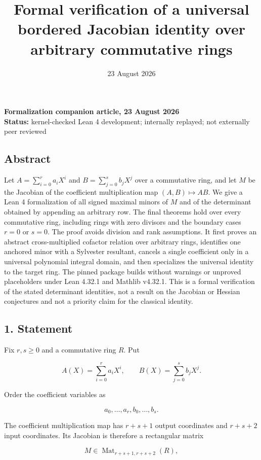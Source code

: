\documentclass[
  11pt,
  a4paper,
]{article}
\title{Formal verification of a universal bordered Jacobian identity
over arbitrary commutative rings}
\author{}
\date{23 August 2026}
\begin{document}
\maketitle

\textbf{Formalization companion article, 23 August 2026}\\
\textbf{Status:} kernel-checked Lean 4 development; internally replayed;
not externally peer reviewed

\subsection{Abstract}\label{abstract}

Let \(A=\sum_{i=0}^r a_iX^i\) and \(B=\sum_{j=0}^s b_jX^j\) over a
commutative ring, and let \(M\) be the Jacobian of the coefficient
multiplication map \((A,B)\mapsto AB\). We give a Lean 4 formalization
of all signed maximal minors of \(M\) and of the determinant obtained by
appending an arbitrary row. The final theorems hold over every
commutative ring, including rings with zero divisors and the boundary
cases \(r=0\) or \(s=0\). The proof avoids division and rank
assumptions. It first proves an abstract cross-multiplied cofactor
relation over arbitrary rings, identifies one anchored minor with a
Sylvester resultant, cancels a single coefficient only in a universal
polynomial integral domain, and then specializes the universal identity
to the target ring. The pinned package builds without warnings or
unproved placeholders under Lean 4.32.1 and Mathlib v4.32.1. This is a
formal verification of the stated determinant identities, not a result
on the Jacobian or Hessian conjectures and not a priority claim for the
classical identity.

\subsection{1. Statement}\label{statement}

Fix \(r,s\ge0\) and a commutative ring \(R\). Put

\[
A(X)=\sum_{i=0}^r a_iX^i,
\qquad
B(X)=\sum_{j=0}^s b_jX^j.
\]

Order the coefficient variables as

\[
a_0,\ldots,a_r,b_0,\ldots,b_s.
\]

The coefficient multiplication map has \(r+s+1\) output coordinates and
\(r+s+2\) input coordinates. Its Jacobian is therefore a rectangular
matrix

\[
M\in\operatorname{Mat}_{r+s+1,r+s+2}(R),
\]
\end{document}
